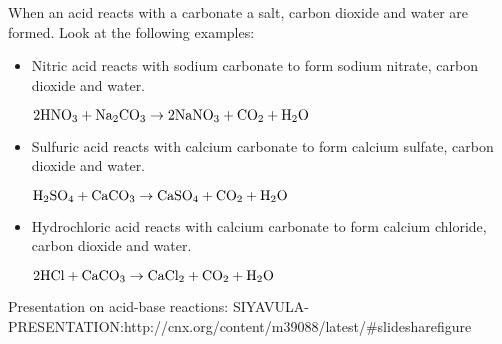 When an acid reacts with a carbonate a salt, carbon dioxide and water are formed. Look at the following examples:\\

\begin{itemize}
\item{Nitric acid reacts with sodium carbonate to form sodium nitrate, carbon dioxide and water.
\begin{center}
$\rm{2HNO_{3} + Na_{2}CO_{3} \rightarrow 2NaNO_{3} + CO_{2} + H_{2}O}$\\
\end{center}
}
\item{Sulfuric acid reacts with calcium carbonate to form calcium sulfate, carbon dioxide and water.
\begin{center}
$\rm{H_{2}SO_{4} + CaCO_{3} \rightarrow CaSO_{4} + CO_{2} + H_{2}O}$\\
\end{center}
}
\item{Hydrochloric acid reacts with calcium carbonate to form calcium chloride, carbon dioxide and water.
\begin{center}
$\rm{2HCl + CaCO_{3} \rightarrow CaCl_{2} + CO_{2} + H_{2}O}$
\end{center}
}
\end{itemize}
Presentation on acid-base reactions: SIYAVULA-PRESENTATION:http://cnx.org/content/m39088/latest/#slidesharefigure
